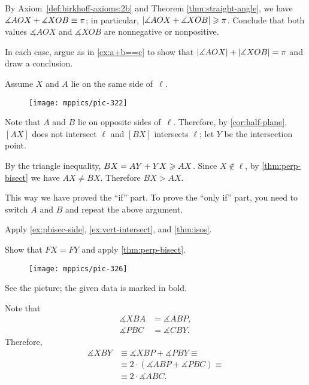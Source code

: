
\setcounter{eqtn}{0}


By Axiom~\ref{def:birkhoff-axioms:2b} and Theorem \ref{thm:straight-angle}, we have
$\measuredangle AOX+\measuredangle XOB\equiv\pi$; in particular, $|\measuredangle AOX+\measuredangle XOB|\geqslant\pi$.
Conclude that both values $\measuredangle AOX$ and $\measuredangle XOB$ are nonnegative or nonpositive.

In each case, argue as in \ref{ex:a+b==c} to show that $|\measuredangle AOX|+|\measuredangle XOB|=\pi$ and draw a conclusion.

Assume $X$ and $A$ lie on the same side of~$\ell$.

\begin{wrapfigure}{r}{27mm}
\vskip-4mm
\centering
\texttt{[image: mppics/pic-322]}
\end{wrapfigure}

Note that $A$ and $B$ lie on opposite sides of~$\ell$.
Therefore, by \ref{cor:half-plane}, 
$[AX]$ does not intersect $\ell$ 
and $[BX]$ intersects $\ell$;
let $Y$ be the intersection point.

By the triangle inequality, $BX=AY+YX\geqslant AX$.
Since $X\notin\ell$, by \ref{thm:perp-bisect} we have $AX\ne BX$.
Therefore $BX> AX$.

This way we have proved the ``if'' part.
To prove the ``only if'' part, you need to switch $A$ and $B$ and
repeat the above argument.

Apply \ref{ex:pbisec-side}, \ref{ex:vert-intersect}, and \ref{thm:isos}.

 Show that $FX=FY$ and apply \ref{thm:perp-bisect}.

\begin{wrapfigure}{r}{27mm}
\vskip-4mm
\centering
\texttt{[image: mppics/pic-326]}
\end{wrapfigure}

See the picture; the given data is marked in bold.

Note that
\begin{align*}
\measuredangle XBA&=\measuredangle ABP,
\\
\measuredangle PBC&=\measuredangle CBY.
\end{align*}
Therefore,
\begin{align*}
\measuredangle XBY
&\equiv
\measuredangle XBP+\measuredangle PBY\equiv
\\
&\equiv
 2\cdot(\measuredangle ABP+\measuredangle PBC)\equiv
\\
&
\equiv
 2\cdot \measuredangle ABC.
\end{align*}


